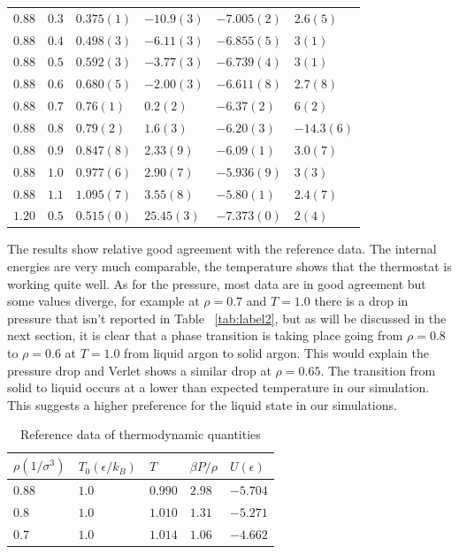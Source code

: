 \documentclass[
10pt, %
a4paper, %
oneside, %
headinclude,footinclude, %
BCOR5mm, %
]{scrartcl}
\begin{document}
\begin{table}[hbt]
\begin{tabular}{llllll}
$0.88$ & $0.3$ & $0.375(1)$ & $-10.9(3)$ & $-7.005(2)$ & $2.6(5)$\\
$0.88$ & $0.4$ & $0.498(3)$ & $-6.11(3)$ & $-6.855(5)$ & $3(1)$\\
$0.88$ & $0.5$ & $0.592(3)$ & $-3.77(3)$ & $-6.739(4)$ & $3(1)$\\
$0.88$ & $0.6$ & $0.680(5)$ & $-2.00(3)$ & $-6.611(8)$ & $2.7(8)$\\
$0.88$ & $0.7$ & $0.76(1)$ & $ 0.2(2)$ & $-6.37(2)$ & $6(2)$\\
$0.88$ & $0.8$ & $0.79(2)$ & $ 1.6(3)$ & $-6.20(3)$ & $-14.3(6)$\\ 
$0.88$ & $0.9$ & $0.847(8)$ & $ 2.33(9)$ & $-6.09(1)$ & $3.0(7)$\\
$0.88$ & $1.0$ & $0.977(6)$ & $2.90(7)$ & $-5.936(9)$ & $3(3)$ \\
$0.88$ & $1.1$ & $1.095(7)$ & $ 3.55(8)$ & $-5.80(1)$ & $2.4(7)$\\
$1.20$ & $0.5$ & $0.515(0)$ & $ 25.45(3)$ & $-7.373(0)$ & $2(4)$\\
\bottomrule
\bottomrule
\end{tabular}
\label{tab:label}
\end{table}

The results show relative good agreement with the reference data. The internal energies are very much comparable, the temperature shows that the thermostat is working quite well. As for the pressure, most data are in good agreement but some values diverge, for example at $\rho = 0.7$ and $T=1.0$ there is a drop in pressure that isn't reported in Table ~\vref{tab:label2}, but as will be discussed in the next section, it is clear that a phase transition is taking place going from $\rho =0.8$ to $\rho=0.6$ at $T=1.0$ from liquid argon to solid argon. This would explain the pressure drop and Verlet\cite{Verlet:1967md} shows a similar drop at $\rho = 0.65$. The transition from solid to liquid occurs at a lower than expected temperature in our simulation. This suggests a higher preference for the liquid state in our simulations. 



\begin{table}[hbt]
\caption{Reference data of thermodynamic quantities}
\centering
\begin{tabular}{lllll}
\toprule
\toprule
$\rho(1/\sigma^3)$ & $T_0(\epsilon/k_B)$ & $T$ & $\beta P/\rho$ & $U(\epsilon)$ \\
\midrule
$0.88$ & $1.0$ & $0.990$ & $ 2.98$ & $-5.704$ \\
$0.8 $ & $1.0$ & $1.010$ & $ 1.31$ & $-5.271$ \\
$0.7 $ & $1.0$ & $1.014$ & $ 1.06$ & $-4.662$ \\
\bottomrule
\bottomrule
\end{tabular}
\label{tab:label2}
\end{table}
\end{document}
